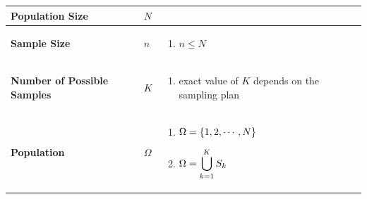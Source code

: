 \begin{customArrayStretch}{1.3}
\begin{longtable}{>{\RaggedRight\arraybackslash}p{4cm} >{\centering\arraybackslash}p{0.5cm} p{10.5cm}}

\hhline{=:=:=} \endfirsthead
\hhline{=:=:=} \endhead
\hhline{=:=:=} \endfoot
\hhline{=:=:=} \endlastfoot


\textbf{Population Size} &
    $N$ &
    \hfill \cite{statistics/book/Statistics-for-Data-Scientists/Maurits-Kaptein}
    \\ \hline

\textbf{Sample Size} &
    $n$ &
    \begin{minipage}{10.3cm}
        \vspace{0.15cm}
        \begin{enumerate}
            \item $n \leq N$
            \hfill \cite{statistics/book/Statistics-for-Data-Scientists/Maurits-Kaptein}

        \end{enumerate}
        \vspace{0.15cm}
    \end{minipage}
    \\ \hline

\textbf{Number of Possible Samples} &
    $K$ &
    \begin{minipage}{10.3cm}
        \vspace{0.15cm}
        \begin{enumerate}
            \item exact value of $K$ depends on the sampling plan
            \hfill \cite{statistics/book/Statistics-for-Data-Scientists/Maurits-Kaptein}

        \end{enumerate}
        \vspace{0.15cm}
    \end{minipage}
    \\ \hline

\textbf{Population} &
    $\Omega$ &
    \begin{minipage}{10.3cm}
        \vspace{0.15cm}
        \begin{enumerate}
            \item $\Omega = \left\{1,2,\cdots,N\right\}$
            \hfill \cite{statistics/book/Statistics-for-Data-Scientists/Maurits-Kaptein}

            \item $\Omega = \displaystyle\bigcup_{k=1}^K S_k$
            \hfill \cite{statistics/book/Statistics-for-Data-Scientists/Maurits-Kaptein}
        \end{enumerate}
        \vspace{0.15cm}
    \end{minipage}
    \\ \hline



\end{longtable}
\end{customArrayStretch}
